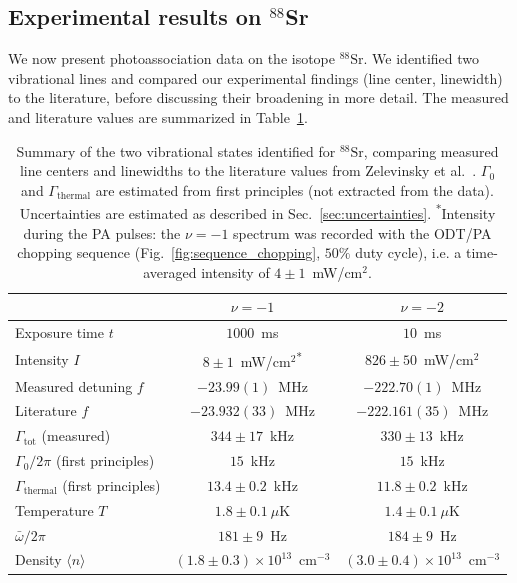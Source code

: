 \subsection{Experimental results on $^{88}$Sr}
We now present photoassociation data on the isotope $^{88}\text{Sr}$. We identified two
vibrational lines and compared our experimental findings (line center, linewidth) to the
literature, before discussing their broadening in more detail. The measured and
literature values are summarized in Table~\ref{tab:88Sr-lines-summary}.

\begin{table}[H]
\centering
\begin{tabular}{lcc}
\toprule
 & $\nu=-1$ & $\nu=-2$ \\
\midrule
Exposure time $t$ & $1000$~ms & $10$~ms \\
Intensity $I$ & $8\pm1$~mW/cm$^2$\textsuperscript{*} & $826\pm50$~mW/cm$^2$ \\
\addlinespace
Measured detuning $f$ & $-23.99 (1)$~MHz & $-222.70(1)$~MHz \\
Literature $f$ \cite{zelevinsky_narrow_2006} & $-23.932(33)$~MHz & $-222.161(35)$~MHz \\
\addlinespace
$\Gamma_{\text{tot}}$ (measured) & $344 \pm 17$~kHz & $330 \pm 13$~kHz \\
$\Gamma_0/2\pi$ (first principles) & $15$~kHz & $15$~kHz \\
$\Gamma_{\text{thermal}}$ (first principles) & $13.4\pm0.2$~kHz & $11.8\pm0.2$~kHz \\
\addlinespace
Temperature $T$ & $1.8\pm0.1~\mu$K & $1.4\pm0.1~\mu$K \\
$\bar\omega/2\pi$ & $181\pm9$~Hz & $184\pm9$~Hz \\
Density $\langle n\rangle$ & $(1.8\pm0.3)\times10^{13}$~cm$^{-3}$ & $(3.0\pm0.4)\times10^{13}$~cm$^{-3}$ \\
\bottomrule
\end{tabular}
\caption{Summary of the two vibrational states identified for $^{88}\text{Sr}$, comparing
measured line centers and linewidths to the literature values from
Zelevinsky et al.~\cite{zelevinsky_narrow_2006}. $\Gamma_0$ and $\Gamma_{\text{thermal}}$
are estimated from first principles (not extracted from the data). Uncertainties are estimated as described in Sec.~\ref{sec:uncertainties}. 
\textsuperscript{*}Intensity during the PA pulses: the $\nu=-1$ spectrum was recorded with the
ODT/PA chopping sequence (Fig.~\ref{fig:sequence_chopping}, $50\%$ duty cycle), i.e. a
time-averaged intensity of $4\pm1$~mW/cm$^2$.}
\label{tab:88Sr-lines-summary}
\end{table}

